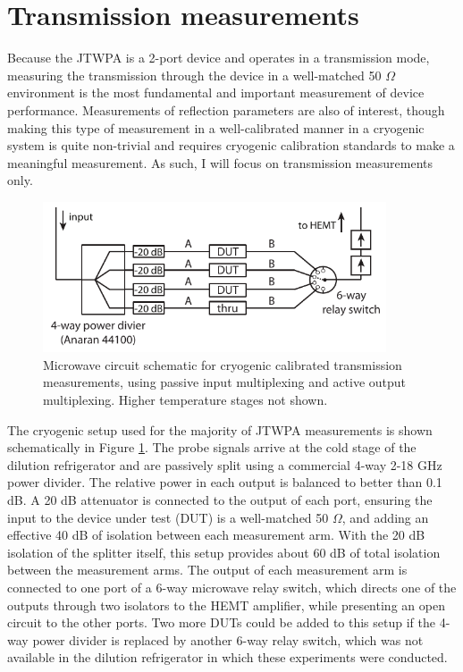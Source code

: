 \section{Transmission measurements}

Because the JTWPA is a 2-port device and operates in a transmission mode, measuring the transmission through the device in a well-matched 50 $\Omega$ environment is the most fundamental and important measurement of device performance.  Measurements of reflection parameters are also of interest, though making this type of measurement in a well-calibrated manner in a cryogenic system is quite non-trivial and requires cryogenic calibration standards to make a meaningful measurement.  As such, I will focus on transmission measurements only.

\begin{figure}
\begin{center}
\includegraphics[width=4in]{twpa_exp/trans_meas}
\end{center}
\caption[Cryogenic calibrated transmission measurement setup]{Microwave circuit schematic for cryogenic calibrated transmission measurements, using passive input multiplexing and active output multiplexing.  Higher temperature stages not shown.}
\label{fig:trans_meas}
\end{figure}

The cryogenic setup used for the majority of JTWPA measurements is shown schematically in Figure \ref{fig:trans_meas}.  The probe signals arrive at the cold stage of the dilution refrigerator and are passively split using a commercial 4-way 2-18 GHz power divider.  The relative power in each output is balanced to better than 0.1 dB.  A 20 dB attenuator is connected to the output of each port, ensuring the input to the device under test (DUT) is a well-matched 50 $\Omega$, and adding an effective 40 dB of isolation between each measurement arm.  With the 20 dB isolation of the splitter itself, this setup provides about 60 dB of total isolation between the measurement arms.  The output of each measurement arm is connected to one port of a 6-way microwave relay switch, which directs one of the outputs through two isolators to the HEMT amplifier, while presenting an open circuit to the other ports.  Two more DUTs could be added to this setup if the 4-way power divider is replaced by another 6-way relay switch, which was not available in the dilution refrigerator in which these experiments were conducted.

